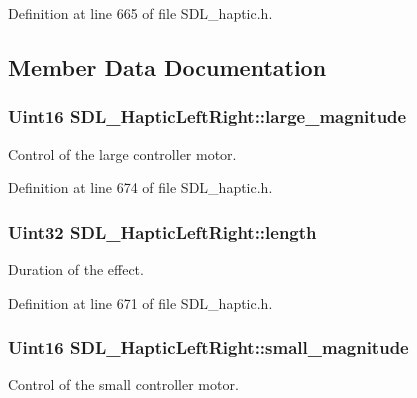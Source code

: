 Definition at line 665 of file S\+D\+L\+\_\+haptic.\+h.



\subsection{Member Data Documentation}
\hypertarget{structSDL__HapticLeftRight_a8cd16fe2200ef10cc4f3b4209adef959}{
\subsubsection[{large\+\_\+magnitude}]{\setlength{\rightskip}{0pt plus 5cm}Uint16 S\+D\+L\+\_\+\+Haptic\+Left\+Right\+::large\+\_\+magnitude}}\label{structSDL__HapticLeftRight_a8cd16fe2200ef10cc4f3b4209adef959}
Control of the large controller motor. 

Definition at line 674 of file S\+D\+L\+\_\+haptic.\+h.

\hypertarget{structSDL__HapticLeftRight_a5b942fee53f1ec77d3fb91a6e89b0196}{
\subsubsection[{length}]{\setlength{\rightskip}{0pt plus 5cm}Uint32 S\+D\+L\+\_\+\+Haptic\+Left\+Right\+::length}}\label{structSDL__HapticLeftRight_a5b942fee53f1ec77d3fb91a6e89b0196}
Duration of the effect. 

Definition at line 671 of file S\+D\+L\+\_\+haptic.\+h.

\hypertarget{structSDL__HapticLeftRight_aaa1f2c1e767a780e447d82efce6cd1cf}{
\subsubsection[{small\+\_\+magnitude}]{\setlength{\rightskip}{0pt plus 5cm}Uint16 S\+D\+L\+\_\+\+Haptic\+Left\+Right\+::small\+\_\+magnitude}}\label{structSDL__HapticLeftRight_aaa1f2c1e767a780e447d82efce6cd1cf}
Control of the small controller motor. 

